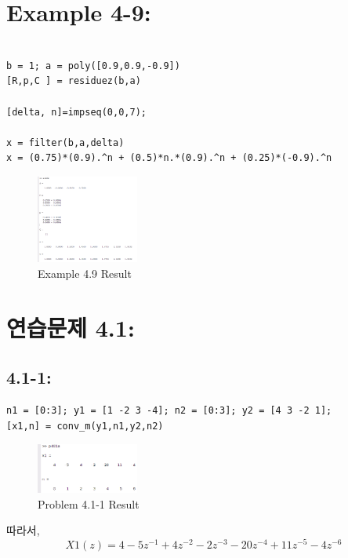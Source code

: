 \documentclass[11pt
  , a4paper
  , article
  , oneside
]{memoir}
\begin{document}
\clearpage

\chapter{Example 4-9:}
\begin{lstlisting}[style=termstyle]
%Example 4.9

b = 1; a = poly([0.9,0.9,-0.9])
[R,p,C ] = residuez(b,a)

[delta, n]=impseq(0,0,7); 

x = filter(b,a,delta)
x = (0.75)*(0.9).^n + (0.5)*n.*(0.9).^n + (0.25)*(-0.9).^n
\end{lstlisting}

\begin{figure}[h!]
	\centering
	\includegraphics[width=0.3\textwidth,height=0.15\textwidth]{./images/ex409.png}
	\caption{Example 4.9 Result}
	\label{fig:Example 4.9 Result}
\end{figure}

\chapter{연습문제 4.1: }
\section{4.1-1: }
\begin{lstlisting}[style=termstyle]
n1 = [0:3]; y1 = [1 -2 3 -4]; n2 = [0:3]; y2 = [4 3 -2 1];
[x1,n] = conv_m(y1,n1,y2,n2)
\end{lstlisting}

\begin{figure}[h!]
	\centering
	\includegraphics[width=0.3\textwidth,height=0.15\textwidth]{./images/p401-1.png}
	\caption{Problem 4.1-1 Result}
	\label{fig:Problem 4.1-1 Result}
\end{figure}
따라서, 
\begin {equation}
X1(z) = 4 -5z^{-1}+4z^{-2}-2z^{-3}-20z^{-4}+11z^{-5}-4z^{-6}
\end {equation}
\end{document}
